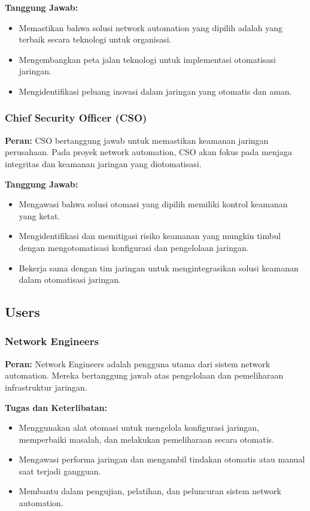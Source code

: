 \textbf{Tanggung Jawab:}
\begin{itemize}
    \item Memastikan bahwa solusi network automation yang dipilih adalah yang terbaik secara teknologi untuk organisasi.
    \item Mengembangkan peta jalan teknologi untuk implementasi otomatisasi jaringan.
    \item Mengidentifikasi peluang inovasi dalam jaringan yang otomatis dan aman.
\end{itemize}

\subsubsection{Chief Security Officer (CSO)}

\textbf{Peran:} CSO bertanggung jawab untuk memastikan keamanan jaringan perusahaan. Pada proyek network automation, CSO akan fokus pada menjaga integritas dan keamanan jaringan yang diotomatisasi.

\textbf{Tanggung Jawab:}
\begin{itemize}
    \item Mengawasi bahwa solusi otomasi yang dipilih memiliki kontrol keamanan yang ketat.
    \item Mengidentifikasi dan memitigasi risiko keamanan yang mungkin timbul dengan mengotomatisasi konfigurasi dan pengelolaan jaringan.
    \item Bekerja sama dengan tim jaringan untuk mengintegrasikan solusi keamanan dalam otomatisasi jaringan.
\end{itemize}

\subsection{Users}

\subsubsection{Network Engineers}

\textbf{Peran:} Network Engineers adalah pengguna utama dari sistem network automation. Mereka bertanggung jawab atas pengelolaan dan pemeliharaan infrastruktur jaringan.

\textbf{Tugas dan Keterlibatan:}
\begin{itemize}
    \item Menggunakan alat otomasi untuk mengelola konfigurasi jaringan, memperbaiki masalah, dan melakukan pemeliharaan secara otomatis.
    \item Mengawasi performa jaringan dan mengambil tindakan otomatis atau manual saat terjadi gangguan.
    \item Membantu dalam pengujian, pelatihan, dan peluncuran sistem network automation.
\end{itemize}

